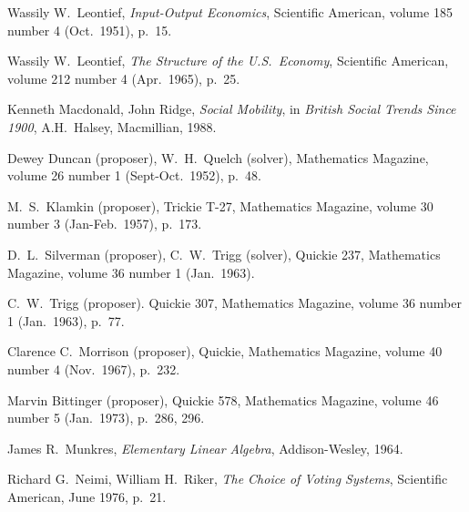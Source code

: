 \begin{thebibliography}{\makebox[2em][c]{{}\hfil{}}}

  Wassily W.\ Leontief,
  \emph{Input-Output Economics},
  Scientific American,
  volume 185 number 4 (Oct.\ 1951),
  p.~15. 

  Wassily W.\ Leontief,
  \emph{The Structure of the U.S.\ Economy},
  Scientific American,
  volume 212 number 4 (Apr.\ 1965),
  p.~25. 


  Kenneth Macdonald, John Ridge,
  \emph{Social Mobility},
  in \emph{British Social Trends Since 1900},
  A.H.~Halsey,
  Macmillian, 1988.


  Dewey Duncan (proposer), W.\ H.\ Quelch (solver),
  Mathematics Magazine,
  volume 26 number 1 (Sept-Oct.\ 1952),
  p.~48.

  M.\ S.\ Klamkin (proposer),
  Trickie T-27,
  Mathematics Magazine,
  volume 30 number 3 (Jan-Feb.\ 1957),
  p.~173.

  D.\ L.\ Silverman (proposer), C.\ W.\ Trigg (solver),
  Quickie 237,
  Mathematics Magazine,
  volume 36 number 1 (Jan.\ 1963).

  C.\ W.\ Trigg (proposer).
  Quickie 307,
  Mathematics Magazine,
  volume 36 number 1 (Jan.\ 1963),
  p.~77.

  Clarence C.\ Morrison (proposer),
  Quickie,
  Mathematics Magazine,
  volume 40 number 4 (Nov.\ 1967),
  p.~232.

  Marvin Bittinger (proposer),
  Quickie 578,
  Mathematics Magazine,
  volume 46 number 5 (Jan.\ 1973),
  p.~286, 296.

  James R.\ Munkres,
  \emph{Elementary Linear Algebra},
  Addison-Wesley,
  1964.

  Richard G.~Neimi, William H.~Riker,
  \emph{The Choice of Voting Systems},
  Scientific American,
  June 1976,
  p.~21.


\end{thebibliography}
